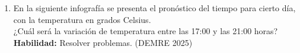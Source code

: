 \documentclass[11pt,letterpaper]{article}
\newcommand{\figureplaceholder}[2][4.2cm]{%
\begin{center}
\fbox{%
\begin{minipage}[c][#1][c]{0.88\linewidth}
\centering \textbf{Espacio reservado para figura}\\[3pt]
#2
\end{minipage}}
\end{center}}
\newenvironment{alternativas}{%
\begin{enumerate}[label=\Alph*), leftmargin=14pt, itemsep=2pt, topsep=2pt]
}{\end{enumerate}}
\begin{document}
\begin{enumerate}[label=\textbf{\arabic*.}, leftmargin=*, itemsep=8pt, start=6]
\item
\begin{minipage}[t]{\linewidth}
En la siguiente infografía se presenta el pronóstico del tiempo para cierto día, con la temperatura en grados Celsius.\\

¿Cuál será la variación de temperatura entre las 17:00 y las 21:00 horas?\\
\textbf{Habilidad:} Resolver problemas. (DEMRE 2025)\\
\\%
\begin{minipage}{\linewidth}
\vspace{7mm}
\end{minipage}
\vspace{7mm}
\end{minipage}


\end{enumerate}
\end{document}
